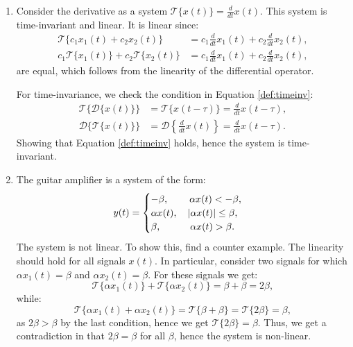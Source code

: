 \begin{enumerate}
  \item Consider the derivative as a system $\mathcal{T}\{x(t)\}=\frac{d}{dt}x(t)$.
        This system is time-invariant and linear. It is linear since:
        \begin{align*}
          \mathcal{T}\{c_{1}x_{1}(t)+c_{2}x_{2}(t)\}                & =c_{1}\frac{d}{dt}x_{1}(t) + c_{2}\frac{d}{dt}x_{2}(t), \\
          c_{1}\mathcal{T}\{x_{1}(t)\}+c_{2}\mathcal{T}\{x_{2}(t)\} & =c_{1}\frac{d}{dt}x_{1}(t) + c_{2}\frac{d}{dt}x_{2}(t),
        \end{align*}
        are equal, which follows from the linearity of the differential operator.

        For time-invariance, we check the condition in Equation \ref{def:timeinv}:
        \begin{align*}
          \mathcal{T}\{\mathcal{D}\{x(t)\}\} & =\mathcal{T}\{x(t-\tau)\}=\frac{d}{dt}x(t-\tau),                   \\
          \mathcal{D}\{\mathcal{T}\{x(t)\}\} & =\mathcal{D}\left\{\frac{d}{dt}x(t)\right\}=\frac{d}{dt}x(t-\tau).
        \end{align*}
        Showing that Equation \ref{def:timeinv} holds, hence the system is time-invariant.

  \item The guitar amplifier is a system of the form:
        \[y(t)=\begin{cases}
            -\beta, \quad \hspace{0.4cm} \alpha x(t)<-\beta, \\
            \alpha x(t), \quad |\alpha x(t)|\le \beta,       \\
            \beta, \quad \hspace{0.7cm}\alpha x(t)>\beta.
          \end{cases}\]
        The system is not linear. To show this, find a counter example. The linearity should hold for all signals $x(t)$.
        In particular, consider two signals for which $\alpha x_{1}(t)=\beta$ and $\alpha x_{2}(t)=\beta$.
        For these signals we get:
        \[ \mathcal{T}\{\alpha x_{1}(t)\}+\mathcal{T}\{\alpha x_{2}(t)\}=\beta+\beta=2\beta, \]
        while:
        \[ \mathcal{T}\{\alpha x_{1}(t)+\alpha x_{2}(t)\}=\mathcal{T}\{\beta+\beta\}=\mathcal{T}\{2\beta\}=\beta, \]
        as $2\beta > \beta$ by the last condition, hence we get $\mathcal{T}\{2\beta\}=\beta$.
        Thus, we get a contradiction in that $2\beta=\beta$ for all $\beta$, hence the system is non-linear.


\end{enumerate}
